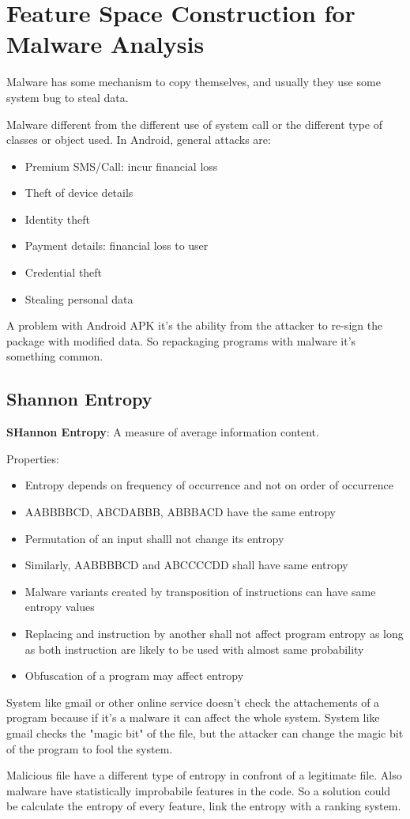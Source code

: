 \section{Feature Space Construction for Malware Analysis}
Malware has some mechanism to copy themselves, and usually they use some system
bug to steal data.

Malware different from the different use of system call or the different type
of classes or object used.
In Android, general attacks are:
\begin{itemize}
  \item Premium SMS/Call: incur financial loss
  \item Theft of device details
  \item Identity theft
  \item Payment details: financial loss to user
  \item Credential theft
  \item Stealing personal data
\end{itemize}

A problem with Android APK it's the ability from the attacker to re-sign the
package with modified data.
So repackaging programs with malware it's something common.

\subsection{Shannon Entropy}
\textbf{SHannon Entropy}: A measure of average information content.

Properties:
\begin{itemize}
  \item Entropy depends on frequency of occurrence and not on order of
occurrence
\item AABBBBCD, ABCDABBB, ABBBACD have the same entropy
\item Permutation of an input shalll not change its entropy
\item Similarly, AABBBBCD and ABCCCCDD shall have same entropy
\item Malware variants created by transposition of instructions can have same
entropy values
\item Replacing and instruction by another shall not affect program entropy as
long as both instruction are likely to be used with almost same probability
\item Obfuscation of a program may affect entropy
\end{itemize}

System like gmail or other online service doesn't check the attachements of a
program because if it's a malware it can affect the whole system. System like
gmail checks the "magic bit" of the file, but the attacker can change the magic
bit of the program to fool the system.

Malicious file have a different type of entropy in confront of a legitimate
file. Also malware have statistically improbabile features in the code.
So a solution could be calculate the entropy of every feature, link the entropy
with a ranking system.
